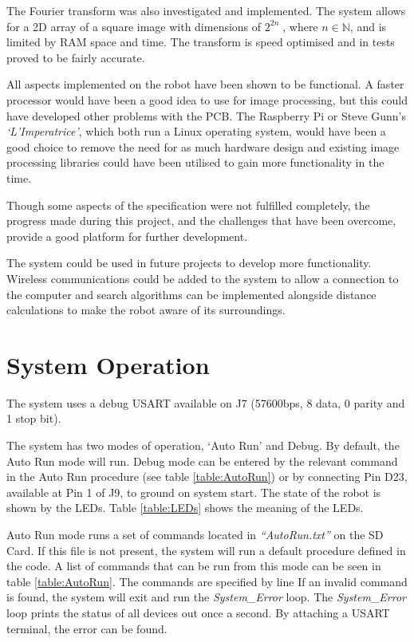 The Fourier transform was also investigated and implemented. The system allows for a 2D array of a square image with dimensions of $2^{2n}\; $, where $n \in \mathbb{N}$, and is limited by RAM space and time. The transform is speed optimised and in tests proved to be fairly accurate. 

All aspects implemented on the robot have been shown to be functional. A faster processor would have been a good idea to use for image processing, but this could have developed other problems with the PCB. The Raspberry Pi or Steve Gunn's \textit{`L'Imperatrice'}, which both run a Linux operating system, would have been a good choice to remove the need for as much hardware design and existing image processing libraries could have been utilised to gain more functionality in the time. 

Though some aspects of the specification were not fulfilled completely, the progress made during this project, and the challenges that have been overcome, provide a good platform for further development.

The system could be used in future projects to develop more functionality. Wireless communications could be added to the system to allow a connection to the computer and search algorithms can be implemented alongside distance calculations to make the robot aware of its surroundings. 

\section{System Operation}

The system uses a debug USART available on J7 (57600bps, 8 data, 0 parity and 1 stop bit).

The system has two modes of operation, `Auto Run' and Debug. By default, the Auto Run mode will run. Debug mode can be entered by the relevant command in the Auto Run procedure (see table \ref{table:AutoRun}) or by connecting Pin D23, available at Pin 1 of J9, to ground on system start. The state of the robot is shown by the LEDs. Table \ref{table:LEDs} shows the meaning of the LEDs.

Auto Run mode runs a set of commands located in \textit{``AutoRun.txt''} on the SD Card. If this file is not present, the system will run a default procedure defined in the code. A list of commands that can be run from this mode can be seen in table \ref{table:AutoRun}. The commands are specified by line If an invalid command is found, the system will exit and run the \textit{System\_Error} loop. The  \textit{System\_Error} loop prints the status of all devices out once a second. By attaching a USART terminal, the error can be found.

